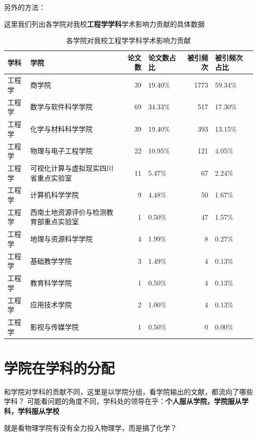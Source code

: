 \documentclass[cn, 11pt, fancy, hide]{elegantbook}
\begin{document}
另外的方法：

这里我们列出各学院对我校\textbf{工程学学科}学术影响力贡献的具体数据

\begin{table}[!h]

\caption{\label{tab:unnamed-chunk-33}各学院对我校工程学学科学术影响力贡献}
\centering
\begin{tabular}[t]{llrlrl}
\toprule
学科 & 学院 & 论文数 & 论文数占比 & 被引频次 & 被引频次占比\\
\midrule
工程学 & 商学院 & 39 & 19.40\% & 1773 & 59.34\%\\
工程学 & 数学与软件科学学院 & 69 & 34.33\% & 517 & 17.30\%\\
工程学 & 化学与材料科学学院 & 39 & 19.40\% & 393 & 13.15\%\\
工程学 & 物理与电子工程学院 & 22 & 10.95\% & 121 & 4.05\%\\
工程学 & 可视化计算与虚拟现实四川省重点实验室 & 11 & 5.47\% & 67 & 2.24\%\\
\addlinespace
工程学 & 计算机科学学院 & 9 & 4.48\% & 50 & 1.67\%\\
工程学 & 西南土地资源评价与检测教育部重点实验室 & 1 & 0.50\% & 47 & 1.57\%\\
工程学 & 地理与资源科学学院 & 4 & 1.99\% & 8 & 0.27\%\\
工程学 & 基础教学学院 & 3 & 1.49\% & 4 & 0.13\%\\
工程学 & 教育科学学院 & 1 & 0.50\% & 4 & 0.13\%\\
\addlinespace
工程学 & 应用技术学院 & 2 & 1.00\% & 4 & 0.13\%\\
工程学 & 影视与传媒学院 & 1 & 0.50\% & 0 & 0.00\%\\
\bottomrule
\end{tabular}
\end{table}

\hypertarget{ux5b66ux9662ux5728ux5b66ux79d1ux7684ux5206ux914d}{%
\section{学院在学科的分配}\label{ux5b66ux9662ux5728ux5b66ux79d1ux7684ux5206ux914d}}

和学院对学科的贡献不同，这里是以学院分组，看学院输出的文献，都流向了哪些学科？
可能看问题的角度不同，学科处的领导在乎：\textbf{个人服从学院，学院服从学科，学科服从学校}

就是看物理学院有没有全力投入物理学，而是搞了化学？
\end{document}
